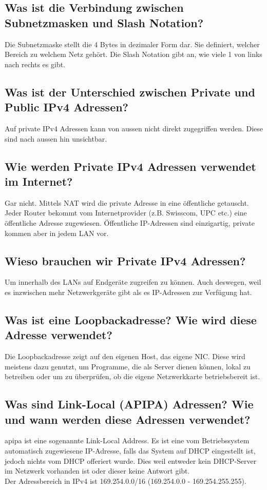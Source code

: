 \subsection*{Was ist die Verbindung zwischen Subnetzmasken und \flqq Slash Notation\frqq{}?}
Die Subnetzmaske stellt die 4 Bytes in dezimaler Form dar. Sie definiert, welcher Bereich zu welchem Netz gehört. Die Slash Notation gibt an, wie viele 1 von links nach rechts es gibt.

\subsection*{Was ist der Unterschied zwischen Private und Public IPv4 Adressen?}\label{sub:private_public_IP}
Auf private IPv4 Adressen kann von aussen nicht direkt zugegriffen werden. Diese sind nach aussen hin unsichtbar.

\subsection*{Wie werden Private IPv4 Adressen verwendet im Internet?}
Gar nicht. Mittels NAT wird die private Adresse in eine öffentliche getauscht. Jeder Router bekommt vom Internetprovider (z.B. Swisscom, UPC etc.) eine öffentliche Adresse zugewiesen. Öffentliche IP-Adressen sind einzigartig, private kommen aber in jedem LAN vor.

\subsection*{Wieso brauchen wir Private IPv4 Adressen?}
Um innerhalb des LANs auf Endgeräte zugreifen zu können. Auch deswegen, weil es inzwischen mehr Netzwerkgeräte gibt als es IP-Adressen zur Verfügung hat.

\subsection*{Was ist eine Loopbackadresse? Wie wird diese Adresse verwendet?}
Die Loopbackadresse zeigt auf den eigenen Host, das eigene NIC. Diese wird meistens dazu genutzt, um Programme, die als Server dienen können, lokal zu betreiben oder um zu überprüfen, ob die eigene Netzwerkkarte betriebsbereit ist.

\subsection*{Was sind \flqq Link-Local\frqq{} (APIPA) Adressen? Wie und wann werden diese Adressen verwendet?}\label{sub:APIPA}
\acrfull{apipa} ist eine sogenannte Link-Local Address. Es ist eine vom Betriebssystem automatisch zugewiesene IP-Adresse, falls das System auf DHCP eingestellt ist, jedoch nichts vom DHCP offeriert wurde. Dies weil entweder kein DHCP-Server im Netzwerk vorhanden ist oder dieser keine Antwort gibt.\\Der Adressbereich in IPv4 ist 169.254.0.0/16 (169.254.0.0 - 169.254.255.255).

